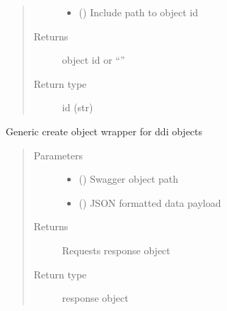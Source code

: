 \documentclass[letterpaper,10pt,english]{sphinxmanual}
\begin{document}
\begin{fulllineitems}
\begin{fulllineitems}
\begin{quote}
\begin{description}
\begin{itemize}
\item {} 
\sphinxAtStartPar
{} () \textendash{} Include path to object id

\end{itemize}

\item[{Returns}] \leavevmode
\sphinxAtStartPar
object id or “”

\item[{Return type}] \leavevmode
\sphinxAtStartPar
id (str)

\end{description}\end{quote}

\end{fulllineitems}


\begin{fulllineitems}
\label{\detokenize{b1sw-class:bloxone.b1sw.update}}
\sphinxAtStartPar
Generic create object wrapper for ddi objects
\begin{quote}\begin{description}
\item[{Parameters}] \leavevmode\begin{itemize}
\item {} 
\sphinxAtStartPar
{} () \textendash{} Swagger object path

\item {} 
\sphinxAtStartPar
{} () \textendash{} JSON formatted data payload

\end{itemize}

\item[{Returns}] \leavevmode
\sphinxAtStartPar
Requests response object

\item[{Return type}] \leavevmode
\sphinxAtStartPar
response object

\end{description}\end{quote}

\end{fulllineitems}


\end{fulllineitems}
\end{document}
